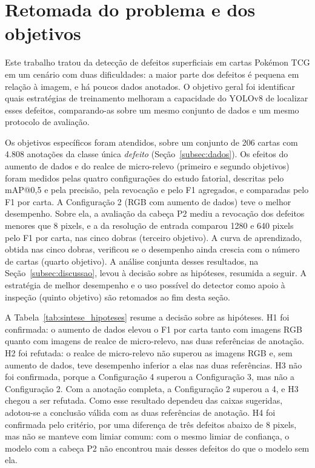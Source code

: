 \documentclass[
    12pt,                %
    openright,           %
    oneside,             %
    a4paper,             %
    english,             %
    brazil               %
]{abntex2}
\begin{document}
\section{Retomada do problema e dos objetivos}
\label{sec:retomada}
Este trabalho tratou da detecção de defeitos superficiais em cartas
Pokémon TCG em um cenário com duas dificuldades: a maior parte dos
defeitos é pequena em relação à imagem, e há poucos dados anotados. O objetivo geral foi identificar quais estratégias de
treinamento melhoram a capacidade do YOLOv8 de localizar esses defeitos,
comparando-as sobre um mesmo conjunto de dados e um mesmo protocolo de
avaliação.

Os objetivos específicos foram atendidos, sobre um conjunto de 206
cartas com 4.808 anotações da classe única \textit{defeito}
(Seção~\ref{subsec:dados}). Os efeitos do aumento de dados e do realce
de micro-relevo (primeiro e segundo objetivos) foram medidos pelas
quatro configurações do estudo fatorial, descritas pelo mAP@0,5 e pela
precisão, pela revocação e pelo F1 agregados, e comparadas pelo F1 por
carta. A Configuração 2 (RGB com aumento de dados) teve o melhor desempenho.
Sobre ela, a avaliação da cabeça P2 mediu a revocação dos defeitos
menores que 8 pixels, e a da resolução de entrada comparou 1280 e 640
pixels pelo F1 por carta, nas cinco dobras (terceiro objetivo). A curva de aprendizado,
obtida nas cinco dobras, verificou se o desempenho ainda crescia com o
número de cartas (quarto objetivo). A análise conjunta desses
resultados, na Seção~\ref{subsec:discussao}, levou à decisão sobre as
hipóteses, resumida a seguir. A estratégia de melhor desempenho e o uso
possível do detector como apoio à inspeção (quinto objetivo) são
retomados ao fim desta seção.

A Tabela~\ref{tab:sintese_hipoteses} resume a decisão sobre as
hipóteses. H1 foi confirmada: o aumento de dados elevou o F1 por carta
tanto com imagens RGB quanto com imagens de realce de micro-relevo, nas
duas referências de anotação. H2 foi refutada: o realce de micro-relevo
não superou as imagens RGB e, sem aumento de dados, teve desempenho
inferior a elas nas duas referências. H3 não foi confirmada, porque a
Configuração 4 superou a Configuração 3, mas não a Configuração 2. Com a
anotação completa, a Configuração 2 superou a 4, e H3 chegou a ser
refutada. Como esse resultado dependeu das caixas sugeridas, adotou-se
a conclusão válida com as duas referências de anotação. H4
foi confirmada pelo critério, por uma diferença de três defeitos abaixo
de 8 pixels, mas não se manteve com limiar comum: com o mesmo limiar de
confiança, o modelo com a cabeça P2 não encontrou mais desses defeitos
do que o modelo sem ela.
\end{document}

